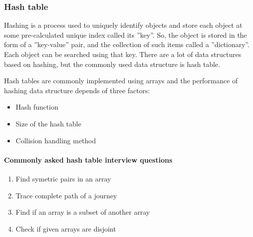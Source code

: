 \subsubsection{Hash table}
Hashing is a process used to uniquely identify objects and store each object at some pre-calculated unique index called its ''key''. So, the object is stored in the form of a ''key-value'' pair, and the collection of such items called a ''dictionary''. Each object can be searched using that key. There are a lot of data structures based on hashing, but the commonly used data structure is hash table.

Hash tables are commonly implemented using arrays and the performance of hashing data structure depends of three factors:
\begin{itemize}
    \item { Hash function }
    \item { Size of the hash table }
    \item { Collision handling method }
\end{itemize}

\paragraph{Commonly asked hash table interview questions}
\begin{enumerate}
    \item { Find symetric pairs in an array }
    \item { Trace complete path of a journey }
    \item { Find if an array is a subset of another array }
    \item { Check if given arrays are disjoint }
\end{enumerate}